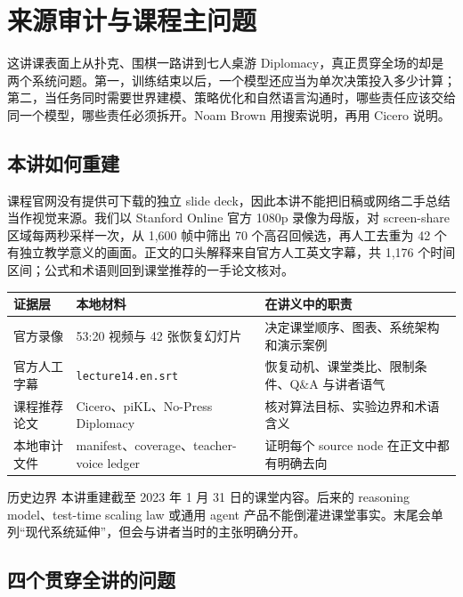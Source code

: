 \documentclass[a4paper]{article}
\begin{document}
\makecscover

\section{来源审计与课程主问题}

这讲课表面上从扑克、围棋一路讲到七人桌游 Diplomacy，真正贯穿全场的却是两个系统问题。第一，训练结束以后，一个模型还应当为单次决策投入多少计算；第二，当任务同时需要世界建模、策略优化和自然语言沟通时，哪些责任应该交给同一个模型，哪些责任必须拆开。Noam Brown 用搜索说明，再用 Cicero 说明。

\subsection{本讲如何重建}

课程官网没有提供可下载的独立 slide deck，因此本讲不能把旧稿或网络二手总结当作视觉来源。我们以 Stanford Online 官方 1080p 录像为母版，对 screen-share 区域每两秒采样一次，从 1,600 帧中筛出 70 个高召回候选，再人工去重为 42 个有独立教学意义的画面。正文的口头解释来自官方人工英文字幕，共 1,176 个时间区间；公式和术语则回到课堂推荐的一手论文核对。

\begin{longtable}{L{0.22\textwidth}L{0.31\textwidth}L{0.37\textwidth}}
\toprule
证据层 & 本地材料 & 在讲义中的职责 \\
\midrule
官方录像 & 53:20 视频与 42 张恢复幻灯片 & 决定课堂顺序、图表、系统架构和演示案例 \\
官方人工字幕 & \texttt{lecture14.en.srt} & 恢复动机、课堂类比、限制条件、Q\&A 与讲者语气 \\
课程推荐论文 & Cicero、piKL、No-Press Diplomacy & 核对算法目标、实验边界和术语含义 \\
本地审计文件 & manifest、coverage、teacher-voice ledger & 证明每个 source node 在正文中都有明确去向 \\
\bottomrule
\end{longtable}

\begin{warningbox}{历史边界}
本讲重建截至 2023 年 1 月 31 日的课堂内容。后来的 reasoning model、test-time scaling law 或通用 agent 产品不能倒灌进课堂事实。末尾会单列“现代系统延伸”，但会与讲者当时的主张明确分开。
\end{warningbox}

\subsection{四个贯穿全讲的问题}
\end{document}
